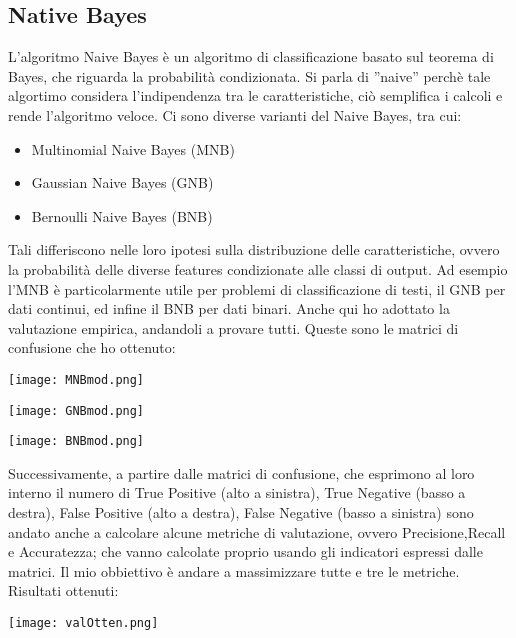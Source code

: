 \documentclass{article}
\begin{document}
\subsection{Native Bayes}
L’algoritmo Naive Bayes è un algoritmo di classificazione basato sul teorema di Bayes, che
riguarda la probabilità condizionata. Si parla di ”naive” perchè tale algortimo considera l’indipendenza tra le caratteristiche, ciò semplifica i calcoli e rende l’algoritmo veloce. Ci sono diverse varianti del Naive Bayes, tra cui:
\begin{itemize}
    \item Multinomial Naive Bayes (MNB)
    \item Gaussian Naive Bayes (GNB)
    \item Bernoulli Naive Bayes (BNB)
\end{itemize}
Tali differiscono nelle loro ipotesi sulla distribuzione delle caratteristiche, ovvero la probabilità delle diverse features condizionate alle classi di output. Ad esempio l’MNB è particolarmente utile per problemi di classificazione di testi, il GNB per dati continui, ed infine il BNB per dati binari. Anche qui ho adottato la valutazione empirica, andandoli a provare tutti.
Queste sono le matrici di confusione che ho ottenuto:
\begin{center}
  \texttt{[image: MNBmod.png]}
\end{center}
\begin{center}
  \texttt{[image: GNBmod.png]}
\end{center}
\begin{center}
  \texttt{[image: BNBmod.png]}
\end{center}
Successivamente, a partire dalle matrici di confusione, che esprimono al loro interno il numero di True Positive (alto a sinistra), True Negative (basso a destra), False Positive (alto a destra), False Negative (basso a sinistra) sono andato anche a calcolare alcune metriche di valutazione, ovvero Precisione,Recall e Accuratezza; che vanno calcolate proprio usando gli indicatori espressi dalle matrici. Il mio obbiettivo è andare a massimizzare tutte e tre le metriche.
Risultati ottenuti:
\begin{center}
  \texttt{[image: valOtten.png]}
\end{center}
\end{document}
